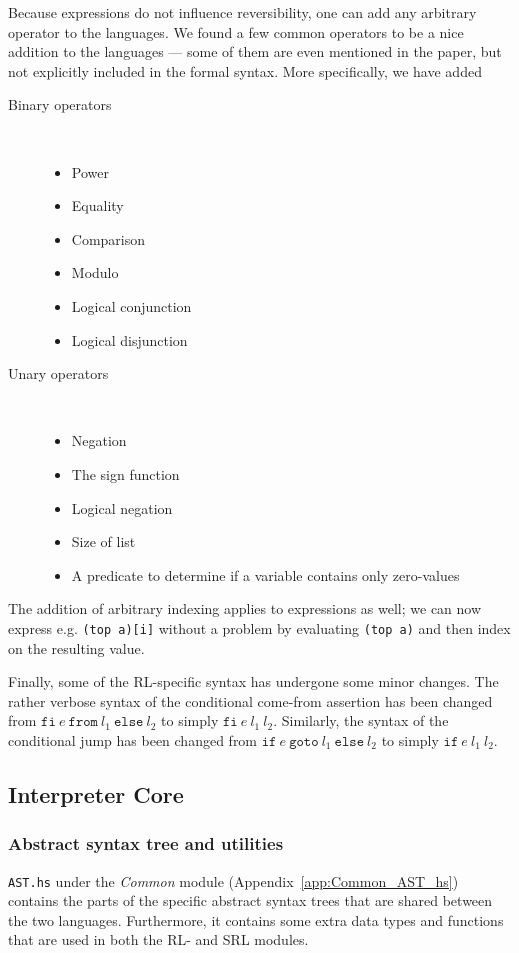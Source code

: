 Because expressions do not influence reversibility, one can add any arbitrary operator to the languages. We found a few common operators to be a nice addition to the languages --- some of them are even mentioned in the paper, but not explicitly included in the formal syntax. More specifically, we have added
\begin{description}
\item[Binary operators]~
  \begin{itemize}
  \item Power
  \item Equality
  \item Comparison
  \item Modulo
  \item Logical conjunction
  \item Logical disjunction
\end{itemize}
\item[Unary operators]~
\begin{itemize}
  \item Negation
  \item The sign function
  \item Logical negation
  \item Size of list
  \item A predicate to determine if a variable contains only zero-values
\end{itemize}
\end{description}
The addition of arbitrary indexing applies to expressions as well; we can now express e.g. \texttt{(top a)[i]} without a problem by evaluating \texttt{(top a)} and then index on the resulting value.

Finally, some of the RL-specific syntax has undergone some minor changes. The rather verbose syntax of the conditional come-from assertion has been changed from $\texttt{fi} \ e \ \texttt{from} \ l_1 \ \texttt{else} \ l_2$ to simply $\texttt{fi} \ e \ l_1 \ l_2$. Similarly, the syntax of the conditional jump has been changed from $\texttt{if} \ e \ \texttt{goto} \ l_1 \ \texttt{else} \ l_2$ to simply $\texttt{if} \ e \ l_1 \ l_2$.

\subsection{Interpreter Core}

\subsubsection{Abstract syntax tree and utilities}
\texttt{AST.hs} under the \textit{Common} module (Appendix~\ref{app:Common_AST_hs}) contains the parts of the specific abstract syntax trees that are shared between the two languages. Furthermore, it contains some extra data types and functions that are used in both the RL- and SRL modules.

